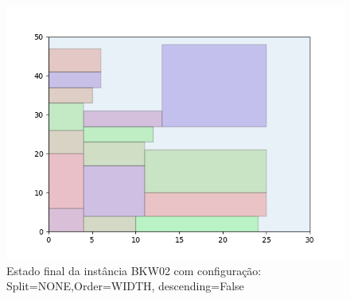 \begin{figure}[H]
    \centering
    \caption[]{Estado final da instância BKW02 com configuração: Split=NONE,Order=WIDTH, descending=False}
    \label{fig:bkw02-none-width-false}
    \includegraphics[scale=0.5]{output/figures/bkw/bkw02/none/width/false/00}
\end{figure}